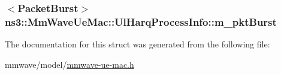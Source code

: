 \subsubsection[{\texorpdfstring{m\+\_\+pkt\+Burst}{m_pktBurst}}]{$<${\bf Packet\+Burst}$>$ ns3\+::\+Mm\+Wave\+Ue\+Mac\+::\+Ul\+Harq\+Process\+Info\+::m\+\_\+pkt\+Burst}\hypertarget{structns3_1_1MmWaveUeMac_1_1UlHarqProcessInfo_ad1c68b88497f8fa92f173f28d62487c2}{}\label{structns3_1_1MmWaveUeMac_1_1UlHarqProcessInfo_ad1c68b88497f8fa92f173f28d62487c2}


The documentation for this struct was generated from the following file\+:\begin{DoxyCompactItemize}
\item 
mmwave/model/\hyperlink{mmwave-ue-mac_8h}{mmwave-\/ue-\/mac.\+h}\end{DoxyCompactItemize}
